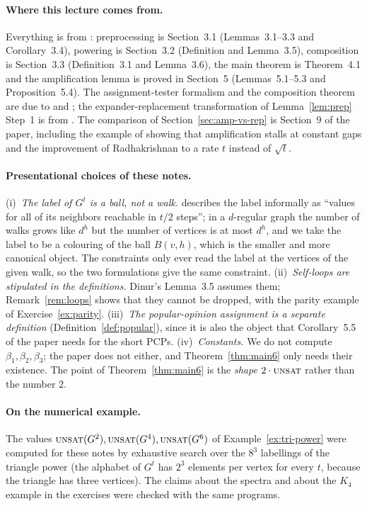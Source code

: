 \paragraph{Where this lecture comes from.}
Everything is from \citet{Dinur07}: preprocessing is Section~3.1 (Lemmas~3.1--3.3 and Corollary~3.4), powering is Section~3.2 (Definition and Lemma~3.5), composition is Section~3.3 (Definition~3.1 and Lemma~3.6), the main theorem is Theorem~4.1 and the amplification lemma is proved in Section~5 (Lemmas~5.1--5.3 and Proposition~5.4).
The assignment-tester formalism and the composition theorem are due to \citet{DinurReingold04} and \citet{BGHSV06}; the expander-replacement transformation of Lemma~\ref{lem:prep} Step~1 is from \citet{PapadimitriouYannakakis91}.
The comparison of Section~\ref{sec:amp-vs-rep} is Section~9 of the paper, including the example of \citet{Bogdanov05} showing that amplification stalls at constant gaps and the improvement of Radhakrishnan to a rate $t$ instead of $\sqrt t$.

\paragraph{Presentational choices of these notes.}
(i)~\emph{The label of $G^t$ is a ball, not a walk.}  \citet{Dinur07} describes the label informally as ``values for all of its neighbors reachable in $t/2$ steps''; in a $d$-regular graph the number of walks grows like $d^{h}$ but the number of vertices is at most $d^{h}$, and we take the label to be a colouring of the ball $B(v,h)$, which is the smaller and more canonical object.  The constraints only ever read the label at the vertices of the given walk, so the two formulations give the same constraint.
(ii)~\emph{Self-loops are stipulated in the definitions.}  Dinur's Lemma~3.5 assumes them; Remark~\ref{rem:loops} shows that they cannot be dropped, with the parity example of Exercise~\ref{ex:parity}.
(iii)~\emph{The popular-opinion assignment is a separate definition} (Definition~\ref{def:popular}), since it is also the object that Corollary~5.5 of the paper needs for the short PCPs.
(iv)~\emph{Constants.}  We do not compute $\beta_1,\beta_2,\beta_3$; the paper does not either, and Theorem~\ref{thm:main6} only needs their existence.  The point of Theorem~\ref{thm:main6} is the \emph{shape} $2\cdot\textsc{unsat}$ rather than the number $2$.

\paragraph{On the numerical example.}
The values $\textsc{unsat}(G^2),\textsc{unsat}(G^4),\textsc{unsat}(G^6)$ of Example~\ref{ex:tri-power} were computed for these notes by exhaustive search over the $8^{3}$ labellings of the triangle power (the alphabet of $G^t$ has $2^{3}$ elements per vertex for every $t$, because the triangle has three vertices).
The claims about the spectra and about the $K_4$ example in the exercises were checked with the same programs.

